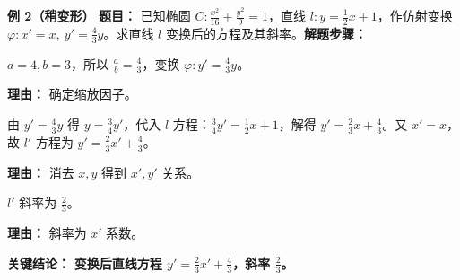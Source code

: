 \medskip
\begin{examplebox}
	\textbf{\textcolor{CExample}{例 2（稍变形）}}
	\textbf{\textcolor{CExample}{题目：}} 已知椭圆 $C:\frac{x^2}{16}+\frac{y^2}{9}=1$，直线 $l: y=\frac{1}{2}x+1$，作仿射变换 $\varphi: x'=x,\ y'=\frac{4}{3}y$。求直线 $l$ 变换后的方程及其斜率。\textbf{\textcolor{CExample}{解题步骤：}}
	\begin{description}[style=nextline, leftmargin=2.8em, labelsep=0.5em, itemsep=0.45em]
		\item[\textbf{第一步（变换参数）：}]
			$a=4,b=3$，所以 $\frac{a}{b}=\frac{4}{3}$，变换 $\varphi: y'=\frac{4}{3}y$。
			\par\textbf{理由：} 确定缩放因子。
		\item[\textbf{第二步（代入变换）：}]
			由 $y'=\frac{4}{3}y$ 得 $y=\frac{3}{4}y'$，代入 $l$ 方程：$\frac{3}{4}y'=\frac{1}{2}x+1$，解得 $y'=\frac{2}{3}x+\frac{4}{3}$。又 $x'=x$，故 $l'$ 方程为 $y'=\frac{2}{3}x'+\frac{4}{3}$。
			\par\textbf{理由：} 消去 $x,y$ 得到 $x',y'$ 关系。
		\item[\textbf{第三步（读取斜率）：}]
			$l'$ 斜率为 $\frac{2}{3}$。
			\par\textbf{理由：} 斜率为 $x'$ 系数。
	\end{description}
	\textbf{\textcolor{CExample}{关键结论：}}
	\textbf{变换后直线方程 $y'=\frac{2}{3}x'+\frac{4}{3}$，斜率 $\frac{2}{3}$。}
\end{examplebox}

